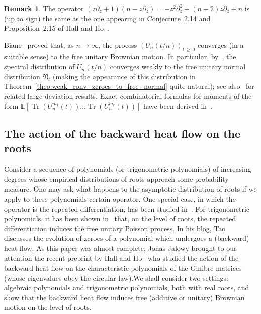 \documentclass[10pt]{amsart}
\theoremstyle{definition}\newtheorem{defi}[theo]{Definition}\newtheorem{rema}[theo]{Remark}\newtheorem{exam}[theo]{Example}\newtheorem{exem}[theo]{Example}\newtheorem{nota}[theo]{Notation}
\DeclareMathOperator*{\Tr}{Tr}
\newcommand{\fnorm}{\mathfrak{N}}
\newcommand{\E}{\mathbb{E}}
\begin{document}
\begin{rema}
The operator $(z \partial_z + 1) (n-z\partial_z) = -z^2 \partial_z^2 + (n-2) z \partial_z + n$ is (up to sign) the same as the one appearing in Conjecture~2.14 and Proposition~2.15 of Hall and Ho~\cite{hall_ho}.
\end{rema}



Biane~\cite{biane,biane_segal_bargmann} proved that, as $n\to\infty$, the process $(U_n(t/n))_{t\,\geq\,0}$ converges (in a suitable sense) to the free unitary Brownian motion. In particular, by~\cite[Theorem~1]{biane}, the spectral distribution of $U_n(t/n)$ converges weakly to the free unitary normal distribution $\fnorm_{t}$ (making the appearance of this distribution in Theorem~\ref{theo:weak_conv_zeroes_to_free_normal} quite natural); see also~\cite[Section~3.3]{cabanal_duvillard_guionnet} for related large deviation results. Exact combinatorial formulas for moments of the form $\E [\Tr (U_n^{m_1}(t))\ldots \Tr (U_n^{m_r}(t))] $ have been derived in~\cite{levy_schur_weyl}.


\subsection{The action of the backward heat flow on the roots} Consider a sequence of polynomials (or trigonometric polynomials) of increasing degrees whose empirical distributions of roots approach some probability measure. One may ask what happens to the asymptotic distribution of roots if we apply to these polynomials certain operator. One special case, in which the operator is the repeated differentiation, has been studied in~\cite{arizmendi_garza_vargas_perales,bogvad_etal,
galligo,
hoskins_kabluchko,
kabluchko_rep_diff_free_poi,
kiselev_tan,
orourke_steinerberger_nonlocal,
steinerberger_real,
steinerberger_conservation,
steinerberger_free}. For trigonometric polynomials, it has been shown in~\cite{kabluchko_rep_diff_free_poi} that, on the level of roots, the repeated differentiation induces the free unitary Poisson process. In his blog, Tao~\cite{tao_blog1,tao_blog2} discusses the evolution of zeroes of a polynomial which undergoes a (backward) heat flow. As this paper was almost complete, Jonas Jalowy brought to our attention the recent preprint by Hall and Ho~\cite{hall_ho} who studied the action of the backward heat flow on the characteristic polynomials of the Ginibre matrices (whose eigenvalues obey the circular law).\linebreak We shall consider two settings: algebraic polynomials and trigonometric polynomials, both with real roots, and show that the backward heat flow induces free (additive or unitary) Brownian motion on the level of roots.
\end{document}
